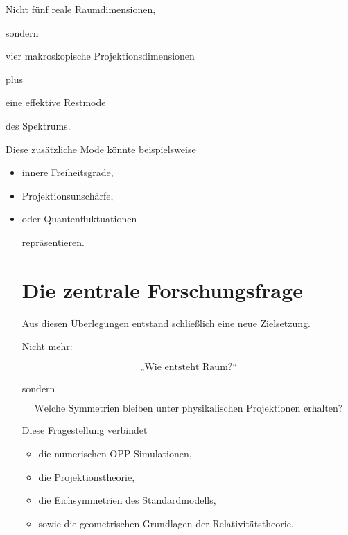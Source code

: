 \begin{itemize}
Nicht fünf reale Raumdimensionen,

sondern

vier makroskopische Projektionsdimensionen

plus

eine effektive Restmode

des Spektrums.

Diese zusätzliche Mode könnte beispielsweise

\begin{itemize}

\item

innere Freiheitsgrade,

\item

Projektionsunschärfe,

\item

oder Quantenfluktuationen

repräsentieren.


\section*{Die zentrale Forschungsfrage}

Aus diesen Überlegungen entstand schließlich eine neue Zielsetzung.

Nicht mehr:

\[
\text{„Wie entsteht Raum?“}
\]

sondern

\[
\boxed{
\text{Welche Symmetrien bleiben unter physikalischen Projektionen erhalten?}
}
\]

Diese Fragestellung verbindet

\begin{itemize}

\item

die numerischen OPP-Simulationen,

\item

die Projektionstheorie,

\item

die Eichsymmetrien des Standardmodells,

\item

sowie die geometrischen Grundlagen der Relativitätstheorie.


\end{itemize}
\end{itemize}
\end{itemize}
